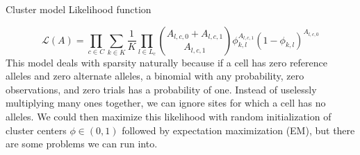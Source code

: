 Cluster model Likelihood function

\begin{equation}\label{equation:likelihood}
\mathcal{L}(A) = \prod_{c \in C} \sum_{k \in K} \frac{1}{K} \prod_{l \in L_c} {A_{l,c,0} + A_{l,c,1}  \choose A_{l,c,1}} \phi^{A_{l,c,1}}_{k,l} (1-\phi_{k,l})^{A_{l,c,0}}
\end{equation}
This model deals with sparsity naturally because if a cell has zero reference alleles and zero alternate alleles, a binomial with any probability, zero observations, and zero trials has a probability of one. Instead of uselessly multiplying many ones together, we can ignore sites for which a cell has no alleles.
We could then maximize this likelihood with random initialization of cluster centers $\phi \in (0,1)$ followed by expectation maximization (EM), but there are some problems we can run into.


